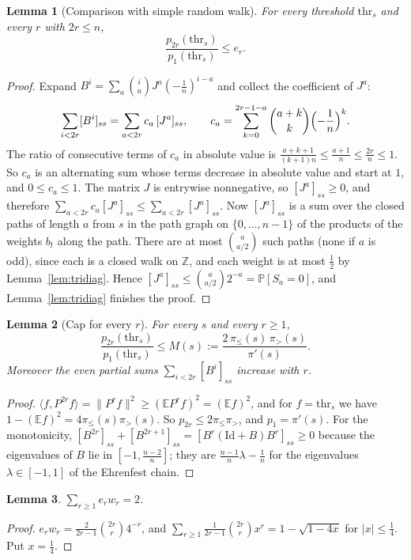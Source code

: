 \documentclass[11pt]{amsart}
\newtheorem{lemma}{Lemma}[section]
\theoremstyle{remark}
\newcommand{\E}{\mathbb E}
\renewcommand{\P}{\mathbb P}
\newcommand{\thr}{\mathrm{thr}}
\begin{document}
\begin{lemma}[Comparison with simple random walk]\label{lem:claimC}
For every threshold $\thr_s$ and every $r$ with $2r\le n$,
\[
 \frac{p_{2r}(\thr_s)}{p_1(\thr_s)}\le e_r.
\]
\end{lemma}

\begin{proof}
Expand $B^i=\sum_a\binom iaJ^a(-\frac1n)^{i-a}$ and collect the coefficient of $J^a$:
\[
 \sum_{i<2r}[B^i]_{ss}=\sum_{a<2r}c_a\,[J^a]_{ss},\qquad c_a=\sum_{k=0}^{2r-1-a}\binom{a+k}{k}\Bigl(-\frac1n\Bigr)^k.
\]
The ratio of consecutive terms of $c_a$ in absolute value is $\frac{a+k+1}{(k+1)n}\le\frac{a+1}{n}\le\frac{2r}n\le1$. So $c_a$ is an alternating sum whose terms decrease in absolute value and start at $1$, and $0\le c_a\le1$. The matrix $J$ is entrywise nonnegative, so $[J^a]_{ss}\ge0$, and therefore $\sum_{a<2r}c_a[J^a]_{ss}\le\sum_{a<2r}[J^a]_{ss}$. Now $[J^a]_{ss}$ is a sum over the closed paths of length $a$ from $s$ in the path graph on $\{0,\dots,n-1\}$ of the products of the weights $b_t$ along the path. There are at most $\binom a{a/2}$ such paths (none if $a$ is odd), since each is a closed walk on $\mathbb Z$, and each weight is at most $\frac12$ by Lemma~\ref{lem:tridiag}. Hence $[J^a]_{ss}\le\binom{a}{a/2}2^{-a}=\P[S_a=0]$, and Lemma~\ref{lem:tridiag} finishes the proof.
\end{proof}

\begin{lemma}[Cap for every $r$]\label{lem:cap}
For every $s$ and every $r\ge1$,
\[
 \frac{p_{2r}(\thr_s)}{p_1(\thr_s)}\le M(s):=\frac{2\,\pi_\le(s)\,\pi_>(s)}{\pi'(s)}.
\]
Moreover the even partial sums $\sum_{i<2r}[B^i]_{ss}$ increase with $r$.
\end{lemma}

\begin{proof}
$\langle f,P^{2r}f\rangle=\|P^rf\|^2\ge(\E P^rf)^2=(\E f)^2$, and for $f=\thr_s$ we have $1-(\E f)^2=4\pi_\le(s)\pi_>(s)$. So $p_{2r}\le2\pi_\le\pi_>$, and $p_1=\pi'(s)$. For the monotonicity, $[B^{2r}]_{ss}+[B^{2r+1}]_{ss}=[B^{r}(\mathrm{Id}+B)B^r]_{ss}\ge0$ because the eigenvalues of $B$ lie in $[-1,\frac{n-2}n]$; they are $\frac{n-1}n\lambda-\frac1n$ for the eigenvalues $\lambda\in[-1,1]$ of the Ehrenfest chain.
\end{proof}

\begin{lemma}\label{lem:two}
$\sum_{r\ge1}e_rw_r=2$.
\end{lemma}

\begin{proof}
$e_rw_r=\frac{2}{2r-1}\binom{2r}r4^{-r}$, and $\sum_{r\ge1}\frac1{2r-1}\binom{2r}rx^r=1-\sqrt{1-4x}$ for $|x|\le\frac14$. Put $x=\frac14$.
\end{proof}
\end{document}
